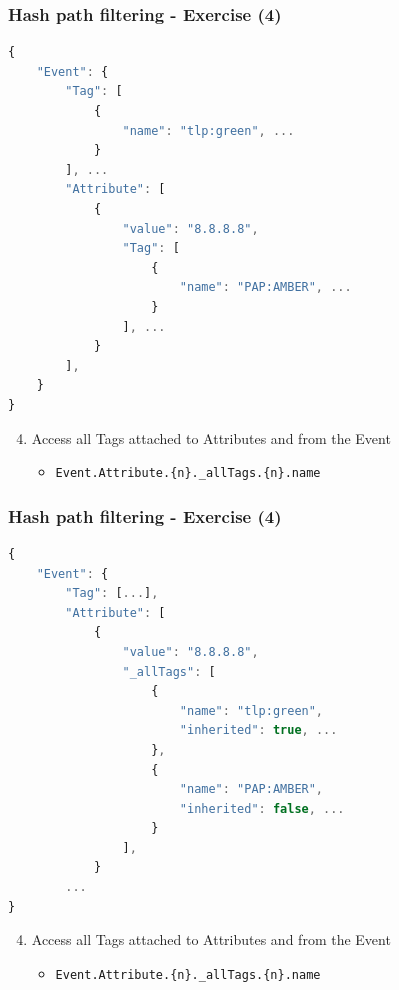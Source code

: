 \begin{frame}[fragile]
    \frametitle{Hash path filtering - Exercise (4)}

\begin{lstlisting}[language=javascript,firstnumber=1]
{
    "Event": {
        "Tag": [
            {
                "name": "tlp:green", ...
            }
        ], ...
        "Attribute": [
            {
                "value": "8.8.8.8",
                "Tag": [
                    {
                        "name": "PAP:AMBER", ...
                    }
                ], ...
            }
        ],
    }
}
\end{lstlisting}
    \begin{enumerate}
        \setcounter{enumi}{3}
        \item Access all Tags attached to Attributes and from the Event
        \begin{itemize}
            \item \texttt{Event.Attribute.\{n\}.\_allTags.\{n\}.name}
        \end{itemize}
    \end{enumerate}
\end{frame}

\begin{frame}[fragile]
    \frametitle{Hash path filtering - Exercise (4)}

\begin{lstlisting}[language=javascript,firstnumber=1]
{
    "Event": {
        "Tag": [...],
        "Attribute": [
            {
                "value": "8.8.8.8",
                "_allTags": [
                    {
                        "name": "tlp:green",
                        "inherited": true, ...
                    },
                    {
                        "name": "PAP:AMBER",
                        "inherited": false, ...
                    }
                ],
            }
        ...
}
\end{lstlisting}
    \begin{enumerate}
        \setcounter{enumi}{3}
        \item Access all Tags attached to Attributes and from the Event
        \begin{itemize}
            \item \texttt{Event.Attribute.\{n\}.\_allTags.\{n\}.name}
        \end{itemize}
    \end{enumerate}
\end{frame}

